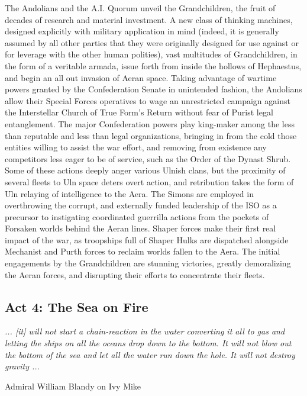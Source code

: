 The Andolians and the A.I. Quorum unveil the Grandchildren, the fruit
of decades of research and material investment. A new class of
thinking machines, designed explicitly with military application in
mind (indeed, it is generally assumed by all other parties that they
were originally designed for use against or for leverage with the
other human polities), vast multitudes of Grandchildren, in the form
of a veritable armada, issue forth from inside the hollows of
Hephaestus, and begin an all out invasion of Aeran space. Taking
advantage of wartime powers granted by the Confederation Senate in
unintended fashion, the Andolians allow their Special Forces
operatives to wage an unrestricted campaign against the Interstellar
Church of True Form's Return without fear of Purist legal
entanglement. The major Confederation powers play king-maker among the
less than reputable and less than legal organizations, bringing in
from the cold those entities willing to assist the war effort, and
removing from existence any competitors less eager to be of service,
such as the Order of the Dynast Shrub. Some of these actions deeply
anger various Ulnish clans, but the proximity of several fleets to Uln
space deters overt action, and retribution takes the form of Uln
relaying of intelligence to the Aera. The Simons are employed in
overthrowing the corrupt, and externally funded leadership of the ISO
as a precursor to instigating coordinated guerrilla actions from the
pockets of Forsaken worlds behind the Aeran lines. Shaper forces make
their first real impact of the war, as troopships full of Shaper Hulks
are dispatched alongside Mechanist and Purth forces to reclaim worlds
fallen to the Aera. The initial engagements by the Grandchildren are
stunning victories, greatly demoralizing the Aeran forces, and
disrupting their efforts to concentrate their fleets.

\subsection{Act 4: The Sea on Fire}

\begin{center}
{\it ... [it] will not start a chain-reaction in the water converting it all to gas and letting the ships on all the oceans drop down to the bottom. It will not blow out the bottom of the sea and let all the water run down the hole. It will not destroy gravity ... } 

Admiral William Blandy on Ivy Mike
\end{center}

